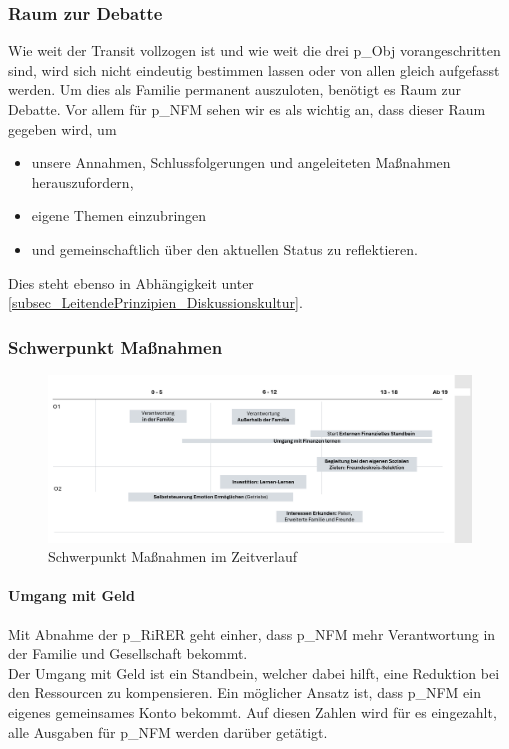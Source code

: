 \subsubsection{Raum zur Debatte} 
Wie weit der Transit vollzogen ist und wie weit die drei \gls{p_Obj} vorangeschritten sind, wird sich nicht eindeutig bestimmen lassen oder von allen gleich aufgefasst werden. Um dies als Familie permanent auszuloten, benötigt es Raum zur Debatte. Vor allem für \gls{p_NFM} sehen wir es als wichtig an, dass dieser Raum gegeben wird, um
\begin{itemize}
	\item unsere Annahmen, Schlussfolgerungen und angeleiteten Maßnahmen herauszufordern, 
	\item eigene Themen einzubringen
	\item und gemeinschaftlich über den aktuellen Status zu reflektieren.
\end{itemize}

Dies steht ebenso in Abhängigkeit unter \ref{subsec_LeitendePrinzipien_Diskussionskultur}.

\subsubsection{Schwerpunkt Maßnahmen}

\begin{figure}[H]
	\centering
	\includegraphics[scale = 0.3]{attachment/chapter_OWN/Scc008.png}
	\caption{Schwerpunkt Maßnahmen im Zeitverlauf}
\end{figure}

\paragraph{Umgang mit Geld}
Mit Abnahme der \gls{p_RiRER} geht einher, dass \gls{p_NFM} mehr Verantwortung in der Familie und Gesellschaft bekommt.\\


Der Umgang mit Geld ist ein Standbein, welcher dabei hilft, eine Reduktion bei den Ressourcen zu kompensieren. Ein möglicher Ansatz ist, dass \gls{p_NFM} ein eigenes gemeinsames Konto bekommt. Auf diesen Zahlen wird für es eingezahlt, alle Ausgaben für \gls{p_NFM} werden darüber getätigt.


